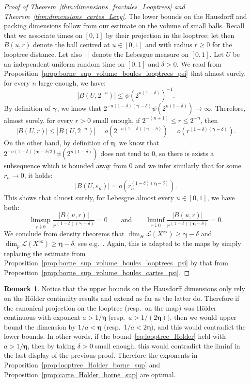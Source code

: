 \documentclass[british, a4paper,11pt]{article}
\numberwithin{equation}{section}
\theoremstyle{definition}
\newtheorem{rem}[thm]{Remark}
\newcommand{\Loop}{\mathscr{L}}
\newcommand{\bdgamma}{\boldsymbol{\gamma}}
\newcommand{\bdeta}{\boldsymbol{\eta}}
\newcommand{\exc}{\mathrm{ex}}
\begin{document}
\begin{proof}[Proof of Theorem~\ref{thm:dimensions_fractales_Looptrees} and Theorem~\ref{thm:dimensions_cartes_Levy}]
The lower bounds on the Hausdorff and packing dimensions follow from our estimate on the volume of small balls. 
Recall that we associate times on $[0,1]$ by their projection in the looptree; let then $B(u,r)$ denote the ball centred at $u \in [0,1]$ and with radius $r \ge 0$ for the looptree distance. Let also $|\cdot|$ denote the Lebesgue measure on $[0,1]$.
Let $U$ be an independent uniform random time on $[0,1]$ and $\delta > 0$.
We read from Proposition~\ref{prop:borne_sup_volume_boules_looptrees_psi} that almost surely, for every $n$ large enough, we have:
\[|B(U,2^{-n})| \leq \psi(2^{n(1-\delta)})^{-1}.\]
By definition of $\bdgamma$, we know that $2^{-n(1-\delta)(\bdgamma-\delta)} \psi(2^{n(1-\delta)}) \to \infty$. Therefore, almost surely, for every $r>0$ small enough, if $2^{-(n+1)} \leq r \leq 2^{-n}$, then
\[|B(U, r)|
\leq |B(U,2^{-n})|
= o(2^{-n(1-\delta)(\bdgamma-\delta)})
= o(r^{(1-\delta)(\bdgamma-\delta)})
.\]
On the other hand, by definition of $\bdeta$, we know that $2^{-n(1-\delta)(\bdeta-\delta/2)} \psi(2^{n(1-\delta)})$ does not tend to $0$, so there is exists a subsequence which is bounded away from $0$ and we infer similarly that for some $r_n \to 0$, it holds:
\[|B(U,\varepsilon_n)|
= o(r_n^{(1-\delta)(\bdeta-\delta)})
.\]
This shows that almost surely, for Lebesgue almost every $u \in [0,1]$, we have both:
\[\limsup_{r \downarrow 0} \frac{|B(u, r)|}{r^{(1-\delta)(\bdgamma-\delta)}} = 0
\qquad\text{and}\qquad
\liminf_{r \downarrow 0} \frac{|B(u, r)|}{r^{(1-\delta)(\bdeta-\delta)}} = 0.\]
We conclude from density theorems that $\dim_{H} \Loop(X^{\exc}) \ge \bdgamma-\delta$ and $\dim_{p} \Loop(X^{\exc}) \ge \bdeta-\delta$, see e.g.~\cite[Theorem~6.9 and~6.11]{Mat95}.
Again, this is adapted to the maps by simply replacing the estimate from Proposition~\ref{prop:borne_sup_volume_boules_looptrees_psi} by that from Proposition~\ref{prop:borne_sup_volume_boules_cartes_psi}.
\end{proof}

\begin{rem}\label{rem:looptree_Holder_borne_inf}
Notice that the upper bounds on the Hausdorff dimensions only rely on the H\"older continuity results and extend as far as the latter do. Therefore if the canonical projection on the looptree (resp.~on the map) was H\"older continuous with exponent $a > 1/\bdeta$ (resp.~$a > 1/(2\bdeta))$, then we would upper bound the dimension by $1/a < \bdeta$ (resp.~$1/a < 2\bdeta)$, and this would contradict the lower bounds.
In other words, if the bound~\eqref{eq:looptree_Holder} held with $a>1/\bdeta$, then by taking $\delta>0$ small enough, this would contradict the liminf in the last display of the previous proof. 
Therefore the exponents in Proposition~\ref{prop:looptree_Holder_borne_sup} and Proposition~\ref{prop:carte_Holder_borne_sup} are optimal.
\end{rem}
\end{document}
